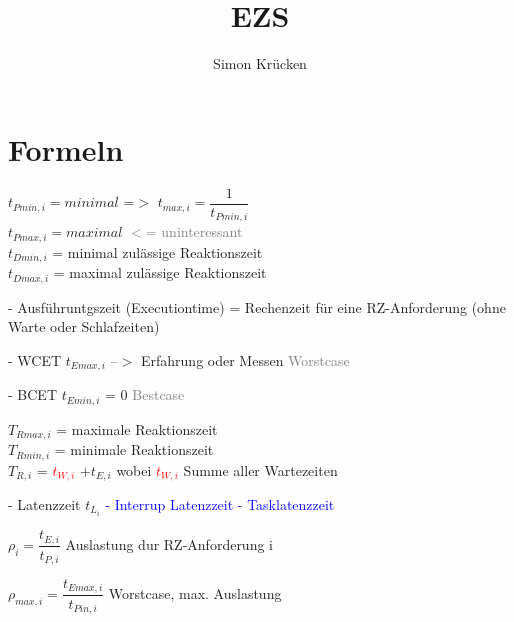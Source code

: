 \documentclass[12pt,a4paper,oneside,ngerman]{article}
\title{EZS}
\author{Simon Krücken}
\begin{document}
    

\section[Formeln]{Formeln}

\(t_{Pmin,i} = minimal\) =$>$ \(t_{max,i} = \dfrac{1}{ t_{Pmin,i} }\) \\
\(t_{Pmax,i} = maximal\) \textcolor{gray}{$<$= uninteressant} \\
\(t_{Dmin,i}\) = minimal zulässige Reaktionszeit \\
\(t_{Dmax,i}\) = maximal zulässige Reaktionszeit

\begin{description}
    \item - Ausführuntgszeit (Executiontime) = Rechenzeit für eine RZ-Anforderung (ohne Warte oder Schlafzeiten)	
        \begin{description}
            \item - WCET \(t_{Emax,i}\) --$>$ Erfahrung oder Messen \textcolor{gray}{Worstcase}
            \item - BCET \(t_{Emin,i}\) = 0 \textcolor{gray}{Bestcase}
        \end{description}
    \end{description}

\(T_{Rmax,i}\) = maximale Reaktionszeit \\
\(T_{Rmin,i}\) = minimale Reaktionszeit \\
\(T_{R,i}\) = \textcolor{red}{\(t_{W,i}\)} \(+ t_{E,i}\) wobei \textcolor{red}{ \(t_{W,i}\) } Summe aller Wartezeiten

- Latenzzeit \(t_{L_i}\)
\textcolor{blue}{
	- Interrup Latenzzeit
	- Tasklatenzzeit
}

\(\rho_i = \dfrac{t_{E,i}}{t_{P,i}}\) Auslastung dur RZ-Anforderung i

\(\rho_{max,i} = \dfrac{t_{Emax,i}}{t_{Pin,i}}\) Worstcase, max. Auslastung

\end{document}
